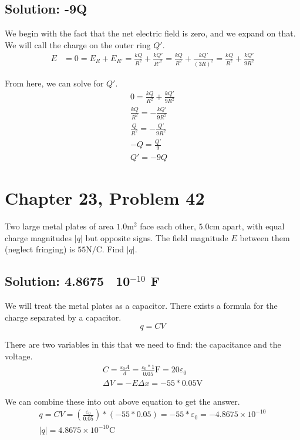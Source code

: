 \documentclass[12pt]{article}
\begin{document}
\subsection*{Solution: -9Q}
We begin with the fact that the net electric field is zero, and we expand on that.
We will call the charge on the outer ring $Q'$.
\begin{align*}
    E   &=  0
        =   E_R + E_{R'}
        =   \frac{kQ}{R^2} + \frac{kQ'}{R'^2}
        =   \frac{kQ}{R^2} + \frac{kQ'}{(3R)^2}
        =   \frac{kQ}{R^2} + \frac{kQ'}{9R^2}
\end{align*}

From here, we can solve for $Q'$.
\begin{gather*}
    0   =   \frac{kQ}{R^2} + \frac{kQ'}{9R^2}\\
    \frac{kQ}{R^2}  =   -\frac{kQ'}{9R^2}\\
    \frac{Q}{R^2}  =   -\frac{Q'}{9R^2}\\
    -Q  =   \frac{Q'}{9}\\
    Q'  =   \boxed{-9Q}
\end{gather*}

\pagebreak
\section{Chapter 23, Problem 42}
Two large metal plates of area $1.0 \unit{\meter^2}$ face each other, $5.0 \unit{\centi\meter}$ apart, with equal charge magnitudes $|q|$ but opposite signs. The field magnitude $E$ between them (neglect fringing) is $55 \unit{\newton/\coulomb}$. Find $|q|$.

\subsection*{Solution: 4.8675 \texttimes\ 10$^{-10}$ F}
We will treat the metal plates as a capacitor.
There exists a formula for the charge separated by a capacitor.
\[
    q   =   CV
\]

There are two variables in this that we need to find: the capacitance and the voltage.
\begin{gather*}
    C   =   \frac{\varepsilon_0 A}{d} = \frac{\varepsilon_0 * 1}{0.05} \unit{\farad}
        =   20\varepsilon_0\\
    \Delta V    =   -E \Delta x
        =   -55 * 0.05 \unit{\volt}
\end{gather*}

We can combine these into out above equation to get the answer.
\begin{gather*}
    q   =   CV
        =   (\frac{\varepsilon_0}{0.05}) * (-55 * 0.05)
        =   -55 * \varepsilon_0
        =   -4.8675 \times 10^{-10}\\
    |q| =   \boxed{4.8675 \times 10^{-10} \unit{\coulomb}}
\end{gather*}
\end{document}
